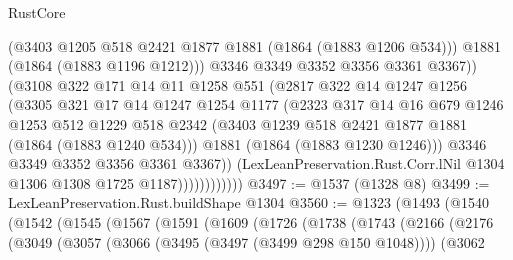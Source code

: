 \begin{lexlean}{RustCore}
\begin{coremodule}
                              (@3403 @1205 @518 @2421 @1877 @1881 (@1864 (@1883 @1206 @534)))
                              @1881
                              (@1864 (@1883 @1196 @1212)))
                            @3346
                            @3349
                            @3352
                            @3356
                            @3361
                            @3367))
                        (@3108
                          @322
                          @171
                          @14
                          @11
                          @1258
                          @551
                          (@2817
                            @322
                            @14
                            @1247
                            @1256
                            (@3305
                              @321
                              @17
                              @14
                              @1247
                              @1254
                              @1177
                              (@2323
                                @317
                                @14
                                @16
                                @679
                                @1246
                                @1253
                                @512
                                @1229
                                @518
                                @2342
                                (@3403 @1239 @518 @2421 @1877 @1881 (@1864 (@1883 @1240 @534)))
                                @1881
                                (@1864 (@1883 @1230 @1246)))
                              @3346
                              @3349
                              @3352
                              @3356
                              @3361
                              @3367))
                          (LexLeanPreservation.Rust.Corr.lNil
                            @1304
                            @1306
                            @1308
                            @1725
                            @1187))))))))))))
@3497 := @1537 (@1328 @8)
@3499 := LexLeanPreservation.Rust.buildShape @1304
@3560 := @1323
    (@1493
      (@1540
        (@1542
          (@1545
            (@1567
              (@1591
                (@1609
                  (@1726
                    (@1738
                      (@1743
                        (@2166
                          (@2176
                            (@3049
                              (@3057
                                (@3066 (@3495 (@3497 (@3499 @298 @150 @1048))))
                                (@3062

\end{coremodule}
\end{lexlean}
